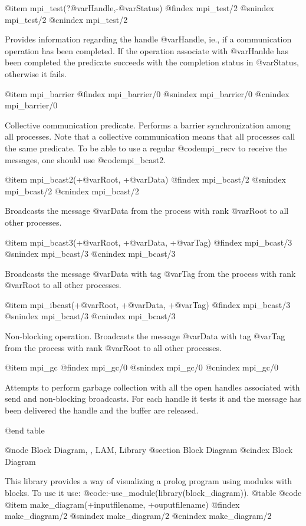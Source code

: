 {{{{{{{{{@item mpi_test(?@var{Handle},-@var{Status})
@findex mpi_test/2
@snindex mpi_test/2
@cnindex mpi_test/2

Provides information regarding the handle @var{Handle}, ie., if a
communication operation has been completed.  If the operation
associate with @var{Hanlde} has been completed the predicate succeeds
with the completion status in @var{Status}, otherwise it fails.

@item mpi_barrier
@findex mpi_barrier/0
@snindex mpi_barrier/0
@cnindex mpi_barrier/0

Collective communication predicate.  Performs a barrier
synchronization among all processes. Note that a collective
communication means that all processes call the same predicate. To be
able to use a regular @code{mpi_recv} to receive the messages, one
should use @code{mpi_bcast2}.


@item mpi_bcast2(+@var{Root}, +@var{Data})
@findex mpi_bcast/2
@snindex mpi_bcast/2
@cnindex mpi_bcast/2

Broadcasts the message @var{Data} from the process with rank @var{Root}
to all other processes.

@item mpi_bcast3(+@var{Root}, +@var{Data}, +@var{Tag})
@findex mpi_bcast/3
@snindex mpi_bcast/3
@cnindex mpi_bcast/3

Broadcasts the message @var{Data} with tag @var{Tag} from the process with rank @var{Root}
to all other processes.

@item mpi_ibcast(+@var{Root}, +@var{Data}, +@var{Tag})
@findex mpi_bcast/3
@snindex mpi_bcast/3
@cnindex mpi_bcast/3

Non-blocking operation. Broadcasts the message @var{Data} with tag @var{Tag}
from the process with rank @var{Root} to all other processes.

@item mpi_gc
@findex mpi_gc/0
@snindex mpi_gc/0
@cnindex mpi_gc/0

Attempts to perform garbage collection with all the open handles
associated with send and non-blocking broadcasts. For each handle it
tests it and the message has been delivered the handle and the buffer
are released.

@end table

@node Block Diagram, , LAM, Library
@section Block Diagram
@cindex Block Diagram

This library provides a way of visualizing a prolog program using modules with blocks.
To use it use: @code{:-use_module(library(block_diagram))}.
@table @code
@item make_diagram(+inputfilename, +ouputfilename)
@findex make_diagram/2
@snindex make_diagram/2
@cnindex make_diagram/2

}}}}}}}}}
